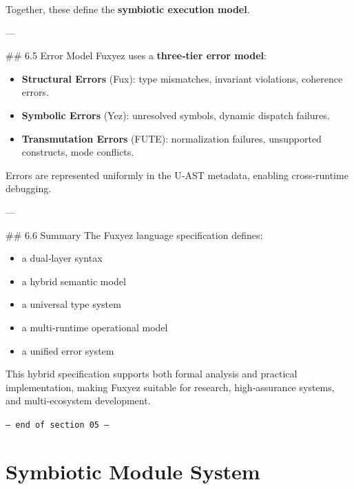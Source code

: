 \documentclass[12pt, a4paper]{book}
\begin{document}
Together, these define the \textbf{symbiotic execution model}.

---

\#\# 6.5 Error Model  
Fuxyez uses a \textbf{three‑tier error model}:

\begin{itemize}
  \item \textbf{Structural Errors} (Fux): type mismatches, invariant violations, coherence errors.  
  \item \textbf{Symbolic Errors} (Yez): unresolved symbols, dynamic dispatch failures.  
  \item \textbf{Transmutation Errors} (FUTE): normalization failures, unsupported constructs, mode conflicts.
\end{itemize}

Errors are represented uniformly in the U‑AST metadata, enabling cross‑runtime debugging.

---

\#\# 6.6 Summary  
The Fuxyez language specification defines:  
\begin{itemize}
  \item a dual‑layer syntax  
  \item a hybrid semantic model  
  \item a universal type system  
  \item a multi‑runtime operational model  
  \item a unified error system  
\end{itemize}

This hybrid specification supports both formal analysis and practical implementation, making Fuxyez suitable for research, high‑assurance systems, and multi‑ecosystem development.
    
    \vspace{1cm}
    \begin{center}
    \color{alienPurple}\texttt{--- end of section 05 ---}
    \end{center}
    \clearpage
    

    \chapter*{Symbiotic Module System}
    
\end{document}
